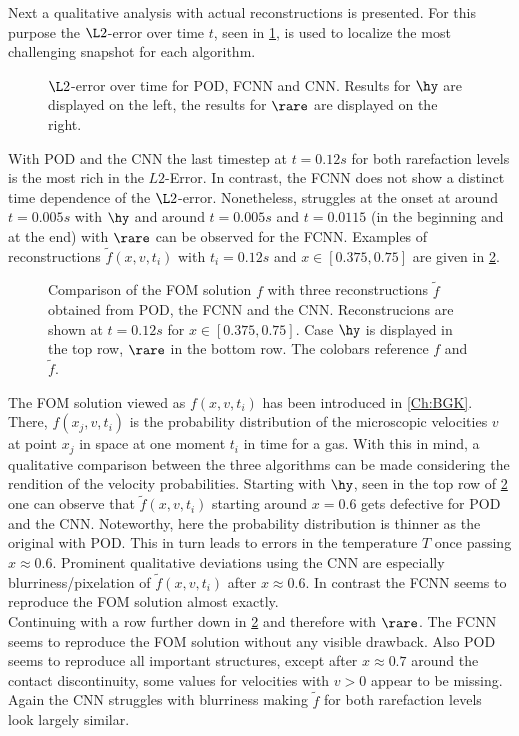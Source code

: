 Next a qualitative analysis with actual reconstructions is presented. For this purpose the \(\L2\)-error over time \(t\), seen in \cref{Fig:ErrTime}, is used to localize the most challenging snapshot for each algorithm.\\ 
\begin{figure}[tp!]
	
	\caption{\(\L2\)-error over time for POD, FCNN and CNN. Results for $\hy$ are displayed on the left, the results for $\rare$ are displayed on the right.}
	\label{Fig:ErrTime}
\end{figure}
With POD and the CNN the last timestep at $t=0.12s$ for both rarefaction levels is the most rich in the $L2$-Error. In contrast, the FCNN does not show a distinct time dependence of the \(\L2\)-error. Nonetheless, struggles at the onset at around $t=0.005s$ with $\hy$ and around \(t=0.005s\) and \(t=0.0115\) (in the beginning and at the end) with $\rare$ can be observed for the FCNN. Examples of reconstructions $\tilde{f}(x,v,t_i)$ with $t_i=0.12s$ and $x \in [0.375,0.75]$ are given in \cref{Fig: ErrWorst}.\\
\begin{figure}[tp!]
	
	\caption{Comparison of the FOM solution \(f\) with three reconstructions \(\tilde{f}\) obtained from POD, the FCNN and the CNN. Reconstrucions are shown at \(t=0.12s\) for \(x\in [0.375,0.75]\). Case $\hy$ is displayed in the top row, $\rare$ in the bottom row. The colobars reference \(f\) and \(\tilde{f}\).}
	\label{Fig: ErrWorst}
\end{figure}
The FOM solution viewed as $f(x,v,t_i)$ has been introduced in \cref{Ch:BGK}. There, $f(x_j,v,t_i)$ is the probability distribution of the microscopic velocities $v$ at point $x_j$ in space at one moment $t_i$ in time for a gas.
With this in mind, a qualitative comparison between the three algorithms can be made considering the rendition of the velocity probabilities. Starting with \(\hy\), seen in the top row of \cref{Fig: ErrWorst} one can observe that \(\tilde{f}(x,v,t_i)\) starting around \(x=0.6\) gets defective for POD and the CNN. Noteworthy, here the probability distribution is thinner as the original with POD. This in turn leads to errors in the temperature \(T\) once passing \(x\approx 0.6\). Prominent qualitative deviations using the CNN are especially blurriness/pixelation of \(\tilde{f}(x,v,t_i)\) after \(x\approx 0.6\). In contrast the FCNN seems to reproduce the FOM solution almost exactly.\\
Continuing with a row further down in \cref{Fig: ErrWorst} and therefore with \(\rare\). The FCNN seems to reproduce the FOM solution without any visible drawback. Also POD seems to reproduce all important structures, except after \(x\approx 0.7\) around the contact discontinuity, some values for velocities with \(v>0\) appear to be missing. Again the CNN struggles with blurriness making \(\tilde{f}\) for both rarefaction levels look largely similar.    

